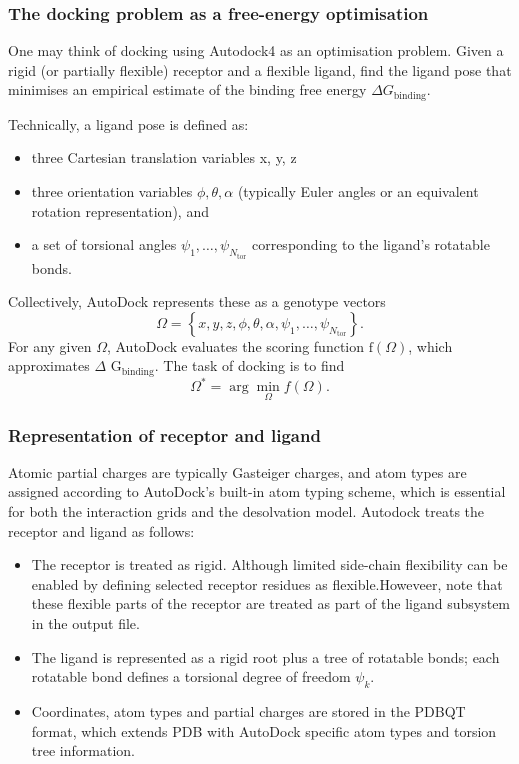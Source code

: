 \documentclass[12pt, a4paper]{article}
\begin{document}
\subsubsection{The docking problem as a free-energy optimisation}

One may think of docking using Autodock4 as an optimisation problem. Given a rigid (or partially flexible) receptor and a flexible ligand, find the ligand pose that minimises an empirical estimate of the binding free energy $\Delta G_{\text{binding}}$.

Technically, a ligand pose is defined as:
\begin{itemize}
  \item three Cartesian translation variables x, y, z
  \item three orientation variables $ \phi, \theta, \alpha $ (typically Euler angles or an equivalent rotation representation), and
  \item a set of torsional angles $ \psi_1, \dots, \psi_{N_{\text{tor}}}$ corresponding to the ligand's rotatable bonds.
\end{itemize}

Collectively, AutoDock represents these as a genotype vectors
\[
  \Omega = \left\{ x, y, z, \phi, \theta, \alpha, \psi_1, \dots, \psi_{N_{\text{tor}}} \right\}.
\]
For any given $\Omega$, AutoDock evaluates the scoring function $\text{f}(\Omega)$, which approximates $\Delta$ $\text{G}_\text{binding}$. The task of docking is to find
\[
  \Omega^{\ast} = \arg\min_{\Omega} f(\Omega).
\]

\subsubsection{Representation of receptor and ligand}
Atomic partial charges are typically Gasteiger charges, and atom types are assigned according to AutoDock's built-in atom typing scheme, which is essential for both the interaction grids and the desolvation model.\cite{CH7_Huey2007} 
Autodock treats the receptor and ligand as follows:
\begin{itemize}
  \item The receptor is treated as rigid. Although limited side-chain flexibility can be enabled by defining selected receptor residues as flexible.Howeveer, note that these flexible parts of the receptor are treated as part of the ligand subsystem in the output file.
  \item The ligand is represented as a rigid root plus a tree of rotatable bonds; each rotatable bond defines a torsional degree of freedom $ \psi_k $.
  \item Coordinates, atom types and partial charges are stored in the PDBQT format, which extends PDB with AutoDock specific atom types and torsion tree information.
\end{itemize}
\end{document}
